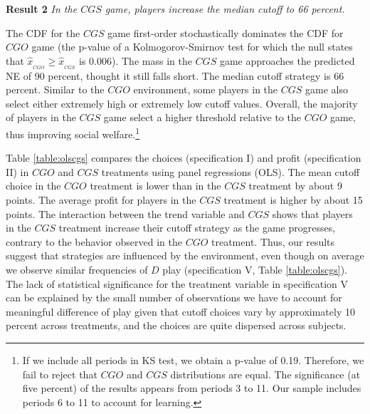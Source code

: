 \documentclass[12pt,english]{article}
\begin{document}
\noindent \textbf{Result 2}
\textit{In the $CGS$ game, players increase the median cutoff to 66 percent.}

The CDF for the $CGS$ game first-order stochastically dominates the CDF for $CGO$ game (the p-value of a Kolmogorov-Smirnov test for which the null states that $\hat{x}_{_{CGO}} \geq \hat{x}_{_{CGS}}$ is 0.006). The mass in the $CGS$ game approaches the predicted NE of 90 percent, thought it still falls short. The median cutoff strategy is 66 percent. Similar to the $CGO$ environment, some players in the $CGS$ game also select either extremely high or extremely low cutoff values. Overall, the majority of players in the $CGS$ game select a higher threshold relative to the $CGO$ game, thus improving social welfare.\footnote{If we include all periods in KS test, we obtain a p-value of 0.19. Therefore, we fail to reject that $CGO$ and $CGS$ distributions are equal. The significance (at five percent) of the results appears from periods 3 to 11. Our sample includes periods 6 to 11 to account for learning.}

Table \ref{table:olscgs} compares the choices (specification I) and profit (specification II) in $CGO$ and $CGS$ treatments using panel regressions (OLS). The mean cutoff choice in the $CGO$ treatment is lower than in the $CGS$ treatment by about 9 points. The average profit for players in the $CGS$ treatment is higher by about 15 points. The interaction between the trend variable and $CGS$ shows that players in the $CGS$ treatment increase their cutoff strategy as the game progresses, contrary to the behavior observed in the $CGO$ treatment. Thus, our results suggest that strategies are influenced by the environment, even though on average we observe similar frequencies of $D$ play (specification V, Table \ref{table:olscgs}). The lack of statistical significance for the treatment variable in specification V can be explained by the small number of observations we have to account for meaningful difference of play given that cutoff choices vary by approximately 10 percent across treatments, and the choices are quite dispersed across subjects.\\ 
\end{document}
